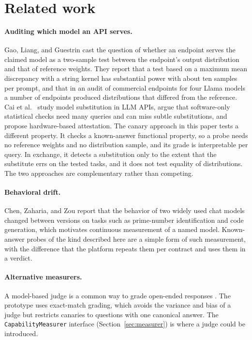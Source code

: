 \section{Related work}
\label{sec:related_work}

\paragraph{Auditing which model an API serves.} Gao, Liang, and Guestrin
\cite{gao2025equality} cast the question of whether an endpoint serves the
claimed model as a two-sample test between the endpoint's output distribution
and that of reference weights. They report that a test based on a maximum mean
discrepancy with a string kernel has substantial power with about ten samples
per prompt, and that in an audit of commercial endpoints for four Llama models
a number of endpoints produced distributions that differed from the reference.
Cai et al.\ \cite{cai2025substitution} study model substitution in LLM APIs,
argue that software-only statistical checks need many queries and can miss
subtle substitutions, and propose hardware-based attestation. The canary
approach in this paper tests a different property. It checks a known-answer
functional property, so a probe needs no reference weights and no distribution
sample, and its grade is interpretable per query. In exchange, it detects a
substitution only to the extent that the substitute errs on the tested tasks,
and it does not test equality of distributions. The two approaches are
complementary rather than competing.

\paragraph{Behavioral drift.} Chen, Zaharia, and Zou \cite{chen2023drift} report
that the behavior of two widely used chat models changed between versions on
tasks such as prime-number identification and code generation, which motivates
continuous measurement of a named model. Known-answer probes of the kind
described here are a simple form of such measurement, with the difference that
the platform repeats them per contract and uses them in a verdict.

\paragraph{Alternative measurers.} A model-based judge is a common way to grade
open-ended responses \cite{zheng2023judging}. The prototype uses exact-match
grading, which avoids the variance and bias of a judge but restricts canaries to
questions with one canonical answer. The \texttt{CapabilityMeasurer} interface
(Section~\ref{sec:measurer}) is where a judge could be introduced.

